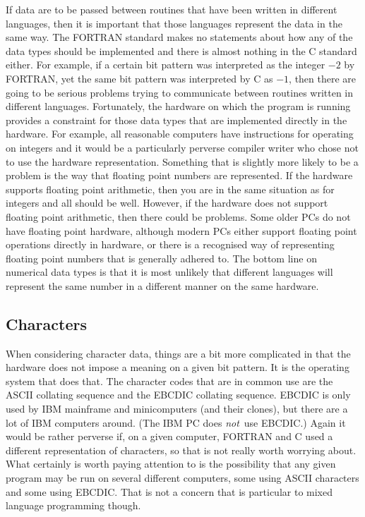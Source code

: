 If data are to be passed between routines that have been written in different
languages, then it is important that those languages represent the data in the
same way. The FORTRAN standard makes no statements about how any of the data
types should be implemented and there is almost nothing in the C standard
either. For example, if a certain bit pattern was interpreted as the integer
$-2$ by FORTRAN, yet the same bit pattern was interpreted by C as $-1$, then
there are going to be serious problems trying to communicate between routines
written in different languages. Fortunately, the hardware on which the program
is running provides a constraint for those data types that are implemented
directly in the  hardware. For example, all reasonable computers have
instructions for operating on integers and it would be a particularly perverse
compiler writer who chose not to use the hardware representation. Something
that is slightly more likely to be a problem is the way that floating point
numbers are represented. If the hardware supports floating point arithmetic,
then you are in the same situation as for integers and all should be well.
However, if the hardware does not support floating point arithmetic, then there
could be problems. Some older PCs do not have floating point hardware, although
modern PCs either support floating point operations directly in hardware, or
there is a recognised way of representing floating point numbers that is
generally adhered to. The bottom line on numerical data types is that it is
most unlikely that different languages will represent the same number in a
different manner on the same hardware.

\subsection{Characters}

When considering character data, things are a bit more complicated in that the
hardware does not impose a meaning on a given bit pattern. It is the operating
system that does that. The character codes that are in common use are the ASCII
collating sequence and the EBCDIC collating sequence. EBCDIC is only used by
IBM mainframe and minicomputers (and their clones), but there are a lot of IBM
computers around. (The IBM PC does {\it not}\, use EBCDIC.) Again it would be
rather perverse if, on a given computer, FORTRAN and C used a different
representation of characters, so that is not really worth worrying about. What
certainly is worth paying attention to is the possibility that any given
program may be run on several different computers, some using ASCII characters
and some using EBCDIC. That is not a concern that is particular to mixed
language programming though.


